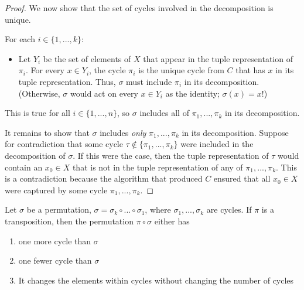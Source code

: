 \begin{proof}
    \vspace{.5cm}

    \newcommand{\tpi}{\widetilde{\pi}}

    We now show that the set of cycles involved in the decomposition is unique. 
    
    For each $i \in \{1, ..., k\}$:
    
    \begin{itemize}
        \item Let $Y_i$ be the set of elements of $X$ that appear in the tuple representation of $\pi_i$. For every $x \in Y_i$, the cycle $\pi_i$ is the unique cycle from $C$ that has $x$ in its tuple representation. Thus, $\sigma$ must include $\pi_i$ in its decomposition. (Otherwise, $\sigma$ would act on every $x \in Y_i$ as the identity; $\sigma(x) = x$!) 
    \end{itemize}
    
    This is true for all $i \in \{1, ..., n\}$, so $\sigma$ includes all of $\pi_1, ..., \pi_k$ in its decomposition.

    It remains to show that $\sigma$ includes \textit{only} $\pi_1, ..., \pi_k$ in its decomposition. Suppose for contradiction that some cycle $\tau \notin \{\pi_1, ..., \pi_k\}$ were included in the decomposition of $\sigma$. If this were the case, then the tuple representation of $\tau$ would contain an $x_0 \in X$ that is not in the tuple representation of any of $\pi_1, ..., \pi_k$. This is a contradiction because the algorithm that produced $C$ ensured that all $x_0 \in X$ were captured by some cycle $\pi_1, ..., \pi_k$.
\end{proof}

\begin{lemma}
    Let $\sigma$ be a permutation, $\sigma = \sigma_k \circ ... \circ \sigma_1$, where $\sigma_1, ..., \sigma_k$ are cycles. If $\pi$ is a transposition, then the permutation $\pi \circ \sigma$ either has

    \begin{enumerate}
        \item one more cycle than $\sigma$
        \item one fewer cycle than $\sigma$
        \item It changes the elements within cycles without changing the number of cycles
    \end{enumerate}
\end{lemma}

